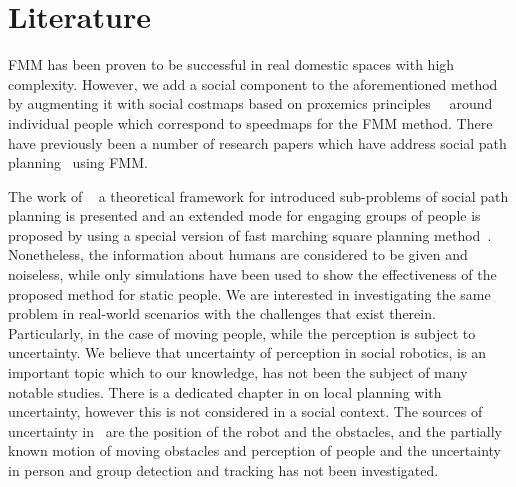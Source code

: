 \section{Literature}
FMM has been proven to be successful in real domestic spaces with high complexity\cite{ventura2015}. However, we add a social component to the aforementioned method by augmenting it with social costmaps \textemdash based on proxemics principles~\cite{kirby2009companion}\textemdash~ around individual people which correspond to speedmaps for the FMM method. %
There have previously been a number of research papers which have address social path planning~\cite{gomez2014fast,gomez2013social} using FMM. %

The work of ~\cite{gomez2014fast} a theoretical framework for introduced sub-problems of social path planning is presented and an extended mode for engaging groups of people is proposed by using a special version of fast marching square planning method~\cite{valero2013fast}. Nonetheless, the information about humans are considered to be given and noiseless, while only simulations have been used to show the effectiveness of the proposed method for static people. We are interested in investigating the same problem in real-world scenarios with the challenges that exist therein. Particularly, in the case of moving people, while the perception is subject to uncertainty. 
We believe that uncertainty of perception in social robotics, is an important topic which to our knowledge, has not been the subject of many notable studies. There is a dedicated chapter in \cite{correa2014uncertainty} on local planning with uncertainty, however this is not considered in a social context. The sources of uncertainty in~\cite{correa2014uncertainty} are the position of the robot and the obstacles, and the partially known motion of moving obstacles and perception of people and the uncertainty in person and group detection and tracking has not been investigated.

